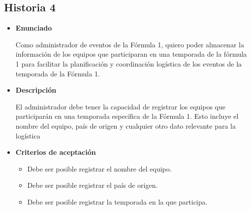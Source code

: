 \documentclass{article}
\begin{document}
	\subsection{Historia 4}
	\begin{itemize}
		
		\item \large{\textbf{Enunciado}}
		\begin{description}
			Como administrador de eventos de la Fórmula 1, quiero poder almacenar la información de los equipos que participaran en una temporada de la fórmula 1 para facilitar la planificación y coordinación logística de los eventos de la temporada de la Fórmula 1.
			
		\end{description}
		
		\item \large{\textbf{Descripción}}
		\begin{description}
			El administrador debe tener la capacidad de registrar los equipos que participarán en una temporada específica de la Fórmula 1. Esto incluye el nombre del equipo, país de origen y cualquier otro dato relevante para la logística
			
		\end{description}
		
		\item \large{\textbf{Criterios de aceptación}}
		\begin{itemize}
			\item Debe ser posible registrar el nombre del equipo.
			\item Debe ser posible registrar el país de origen.
			\item Debe ser posible registrar la temporada en la que participa.
			
		\end{itemize}
		
	\end{itemize}
	
\end{document}
